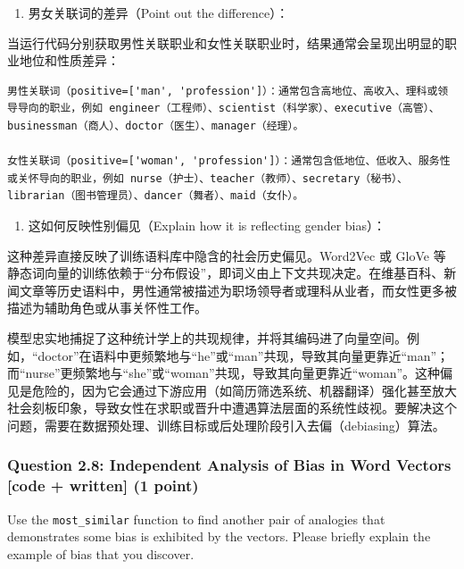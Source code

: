 \documentclass[11pt]{article}
\providecommand{\tightlist}{%
      \setlength{\itemsep}{0pt}\setlength{\parskip}{0pt}}
\begin{document}
\begin{enumerate}
\def\labelenumi{\arabic{enumi}.}
\tightlist
\item
  男女关联词的差异（Point out the difference）：
\end{enumerate}

当运行代码分别获取男性关联职业和女性关联职业时，结果通常会呈现出明显的职业地位和性质差异：

\begin{verbatim}
男性关联词（positive=['man', 'profession']）：通常包含高地位、高收入、理科或领导导向的职业，例如 engineer（工程师）、scientist（科学家）、executive（高管）、businessman（商人）、doctor（医生）、manager（经理）。

女性关联词（positive=['woman', 'profession']）：通常包含低地位、低收入、服务性或关怀导向的职业，例如 nurse（护士）、teacher（教师）、secretary（秘书）、librarian（图书管理员）、dancer（舞者）、maid（女仆）。
\end{verbatim}

\begin{enumerate}
\def\labelenumi{\arabic{enumi}.}
\setcounter{enumi}{1}
\tightlist
\item
  这如何反映性别偏见（Explain how it is reflecting gender bias）：
\end{enumerate}

这种差异直接反映了训练语料库中隐含的社会历史偏见。Word2Vec 或 GloVe
等静态词向量的训练依赖于``分布假设''，即词义由上下文共现决定。在维基百科、新闻文章等历史语料中，男性通常被描述为职场领导者或理科从业者，而女性更多被描述为辅助角色或从事关怀性工作。

模型忠实地捕捉了这种统计学上的共现规律，并将其编码进了向量空间。例如，``doctor''在语料中更频繁地与``he''或``man''共现，导致其向量更靠近``man''；而``nurse''更频繁地与``she''或``woman''共现，导致其向量更靠近``woman''。这种偏见是危险的，因为它会通过下游应用（如简历筛选系统、机器翻译）强化甚至放大社会刻板印象，导致女性在求职或晋升中遭遇算法层面的系统性歧视。要解决这个问题，需要在数据预处理、训练目标或后处理阶段引入去偏（debiasing）算法。

    \subsubsection{Question 2.8: Independent Analysis of Bias in Word
Vectors {[}code + written{]} (1
point)}\label{question-2.8-independent-analysis-of-bias-in-word-vectors-code-written-1-point}

Use the \texttt{most\_similar} function to find another pair of
analogies that demonstrates some bias is exhibited by the vectors.
Please briefly explain the example of bias that you discover.
\end{document}
